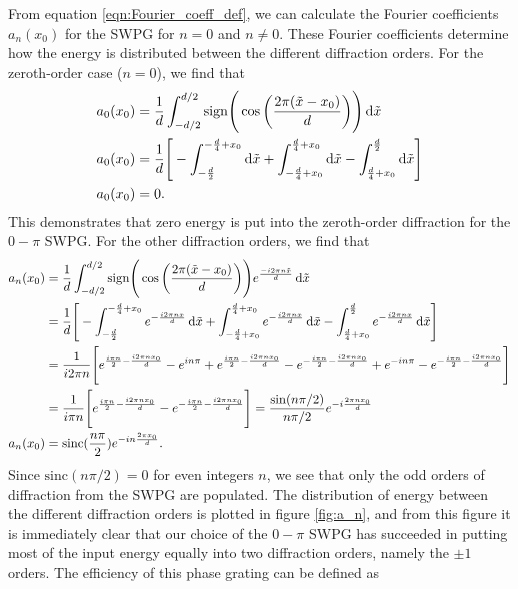 From equation \ref{eqn:Fourier_coeff_def}, we can calculate the Fourier coefficients $a_n(x_0)$ for the SWPG for $n=0$ and $n\neq0$.  These Fourier coefficients determine how the energy is distributed between the different diffraction orders.  For the zeroth-order case ($n=0$), we find that
\begin{equation}
\label{eqn:a0_no_zeta}
\begin{aligned}
a_0(x_0) &= \frac{1}{d}\int_{-d/2}^{d/2} \mathrm{sign}\Bigg( \cos\bigg( \frac{2\pi(\tilde{x}-x_0)}{d}\bigg)\Bigg) \mathop{}\!\mathrm{d}\tilde{x}\\
a_0(x_0) &=\frac{1}{d}\Bigg[ -\int_{-\frac{d}{2}}^{-\frac{d}{4}+x_0}\mathop{}\!\mathrm{d}\tilde{x} 
+\int_{-\frac{d}{4}+x_0}^{\frac{d}{4}+x_0}\mathop{}\!\mathrm{d}\tilde{x}
-\int_{\frac{d}{4}+x_0}^{\frac{d}{2}}\mathop{}\!\mathrm{d}\tilde{x}
\Bigg]\\
a_0(x_0) &=0.
\end{aligned}
\end{equation}
This demonstrates that zero energy is put into the zeroth-order diffraction for the $0-\pi$ SWPG.  For the other diffraction orders, we find that
\begingroup
\allowdisplaybreaks
\begin{equation}
\label{eqn:swpg_fourier_coeff_a_n}
	\begin{aligned}
		a_n(x_0) &= \frac{1}{d}\int_{-d/2}^{d/2} \mathrm{sign}\Bigg( \cos\bigg( \frac{2\pi(\tilde{x}-x_0)}{d}\bigg)\Bigg) e^{\frac{-i2\pi n\tilde{x}}{d}}\mathop{}\!\mathrm{d}\tilde{x}\\
		&=\frac{1}{d}\Bigg[ -\int_{-\frac{d}{2}}^{-\frac{d}{4}+x_0} e^{-\frac{i2\pi n x}{d}}\mathop{}\!\mathrm{d}\tilde{x} 
		+\int_{-\frac{d}{4}+x_0}^{\frac{d}{4}+x_0} e^{-\frac{i2\pi n x}{d}}\mathop{}\!\mathrm{d}\tilde{x}
		-\int_{\frac{d}{4}+x_0}^{\frac{d}{2}} e^{-\frac{i2\pi n x}{d}}\mathop{}\!\mathrm{d}\tilde{x}
		\Bigg]\\
		&=\frac{1}{i2\pi n}\Bigg[
		e^{\frac{i\pi n}{2}-\frac{i2\pi n x_0}{d}} - e^{i n \pi}
		+ e^{\frac{i\pi n}{2}-\frac{i2\pi n x_0}{d}} - e^{-\frac{i\pi n}{2}-\frac{i2\pi n x_0}{d}}
		+e^{-i n \pi} - e^{-\frac{i\pi n}{2}-\frac{i2\pi n x_0}{d}}
		\Bigg]\\
		&=\frac{1}{i\pi n}\Bigg[e^{\frac{i\pi n}{2}-\frac{i2\pi n x_0}{d}}-e^{-\frac{i\pi n}{2}-\frac{i2\pi n x_0}{d}} \Bigg] = \frac{\sin (n\pi/2)}{n\pi/2}e^{-i\frac{2\pi n x_0}{d}}\\
		a_n(x_0) &= \mathrm{sinc}(\frac{n\pi}{2})e^{-i n \frac{2\pi x_0}{d}}.
	\end{aligned}
\end{equation}
\endgroup
Since $\mathrm{sinc}(n\pi/2)=0$ for even integers $n$, we see that only the odd orders of diffraction from the SWPG  are populated. The distribution of energy between the different diffraction orders is plotted in figure \ref{fig:a_n}, and from this figure it is immediately clear that our choice of the $0-\pi$ SWPG has succeeded in putting most of the input energy equally into two diffraction orders, namely the $\pm1$ orders.  The efficiency of this phase grating can be defined as
